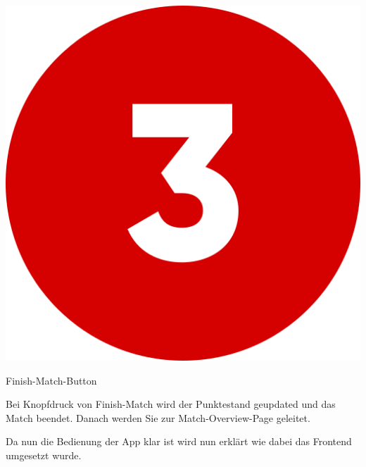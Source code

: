 \bigskip
\includegraphics[scale=0.05]{pics/user-guide/numbers/number-3.png} \begin{LARGE} Finish-Match-Button \end{LARGE}

Bei Knopfdruck von Finish-Match wird der Punktestand geupdated und das Match beendet. Danach werden Sie zur Match-Overview-Page geleitet.

Da nun die Bedienung der App klar ist wird nun erklärt wie dabei das Frontend umgesetzt wurde.